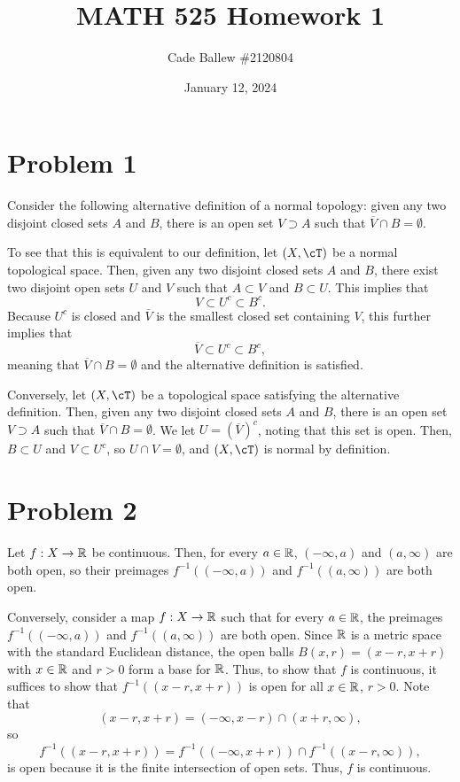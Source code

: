 \documentclass{article}
\title{MATH 525 Homework 1}
\author{Cade Ballew \#2120804}
\date{January 12, 2024}
\begin{document}
	
\maketitle
	
\section{Problem 1}
Consider the following alternative definition of a normal topology: given any two disjoint closed sets $A$ and $B$, there is an open set $V\supset A$ such that $\overline V\cap B=\emptyset$. 

To see that this is equivalent to our definition, let $(X,\cT)$ be a normal topological space. Then, given any two disjoint closed sets $A$ and $B$, there exist two disjoint open sets $U$ and $V$ such that $A\subset V$ and $B\subset U$. This implies that
\[
V\subset U^c\subset B^c.
\]
Because $U^c$ is closed and $\overline V$ is the smallest closed set containing $V$, this further implies that
\[
\overline V\subset U^c\subset B^c,
\]
meaning that $\overline V\cap B=\emptyset$ and the alternative definition is satisfied. 

Conversely, let $(X,\cT)$ be a topological space satisfying the alternative definition. Then, given any two disjoint closed sets $A$ and $B$, there is an open set $V\supset A$ such that $\overline V\cap B=\emptyset$. We let $U=\left(\overline V\right)^c$, noting that this set is open. Then, $B\subset U$ and $V\subset U^c$, so $U\cap V=\emptyset$, and $(X,\cT)$ is normal by definition.

\section{Problem 2}
Let $f:X\to\mathbb{R}$ be continuous. Then, for every $a\in\mathbb{R}$, $(-\infty,a)$ and $(a,\infty)$ are both open, so their preimages $f^{-1}\left((-\infty,a)\right)$ and $f^{-1}\left((a,\infty)\right)$ are both open.

Conversely, consider a map $f:X\to\mathbb{R}$ such that for every $a\in\mathbb{R}$, the preimages $f^{-1}\left((-\infty,a)\right)$ and $f^{-1}\left((a,\infty)\right)$ are both open. Since $\mathbb{R}$ is a metric space with the standard Euclidean distance, the open balls $B(x,r)=(x-r,x+r)$ with $x\in\mathbb{R}$ and $r>0$ form a base for $\mathbb{R}$. Thus, to show that $f$ is continuous, it suffices to show that $f^{-1}\left((x-r,x+r)\right)$ is open for all $x\in\mathbb{R}$, $r>0$. Note that
\[
(x-r,x+r)=(-\infty,x-r)\cap(x+r,\infty),
\]
so
\[
f^{-1}\left((x-r,x+r)\right)=f^{-1}\left((-\infty,x+r)\right)\cap f^{-1}\left((x-r,\infty)\right),
\]
is open because it is the finite intersection of open sets. Thus, $f$ is continuous.
\end{document}

